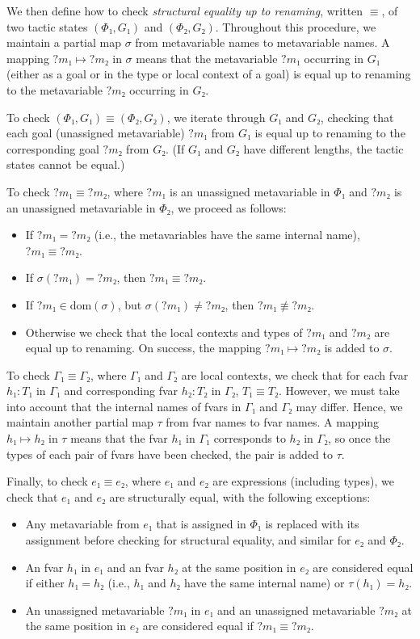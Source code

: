 \documentclass[sigplan,10pt,anonymous,review]{acmart}
\newcommand{\mvar}[1]{{?#1}}
\newcommand{\dom}{\ensuremath{\mathrm{dom}}}
\begin{document}
We then define how to check \emph{structural equality up to renaming}, written $≡$, of two tactic states $(Φ₁, G₁)$ and $(Φ₂, G₂)$.
Throughout this procedure, we maintain a partial map $σ$ from metavariable names to metavariable names.
A mapping $\mvar{m₁} ↦ \mvar{m₂}$ in $σ$ means that the metavariable $\mvar{m₁}$ occurring in $G₁$ (either as a goal or in the type or local context of a goal) is equal up to renaming to the metavariable $\mvar{m₂}$ occurring in $G₂$.

To check $(Φ₁, G₁) ≡ (Φ₂, G₂)$, we iterate through $G₁$ and $G₂$, checking that each goal (unassigned metavariable) $\mvar{m₁}$ from $G₁$ is equal up to renaming to the corresponding goal $\mvar{m₂}$ from $G₂$.
(If $G₁$ and $G₂$ have different lengths, the tactic states cannot be equal.)

To check $\mvar{m₁} ≡ \mvar{m₂}$, where $\mvar{m₁}$ is an unassigned metavariable in $Φ₁$ and $\mvar{m₂}$ is an unassigned metavariable in $Φ₂$, we proceed as follows:
\begin{itemize}
  \item If $\mvar{m₁} = \mvar{m₂}$ (i.e., the metavariables have the same internal name), $\mvar{m₁} ≡ \mvar{m₂}$.
  \item If $σ(\mvar{m₁}) = \mvar{m₂}$, then $\mvar{m₁} ≡ \mvar{m₂}$.
  \item If $\mvar{m₁} ∈ \dom(σ)$, but $σ(\mvar{m₁}) ≠ \mvar{m₂}$, then $\mvar{m₁} ≢ \mvar{m₂}$.
  \item Otherwise we check that the local contexts and types of $\mvar{m₁}$ and $\mvar{m₂}$ are equal up to renaming.
        On success, the mapping $\mvar{m₁} ↦ \mvar{m₂}$ is added to $σ$.
\end{itemize}

To check $Γ₁ ≡ Γ₂$, where $Γ₁$ and $Γ₂$ are local contexts, we check that for each fvar $h₁ : T₁$ in $Γ₁$ and corresponding fvar $h₂ : T₂$ in $Γ₂$, $T₁ ≡ T₂$.
However, we must take into account that the internal names of fvars in $Γ₁$ and $Γ₂$ may differ.
Hence, we maintain another partial map $τ$ from fvar names to fvar names.
A mapping $h₁ ↦ h₂$ in $τ$ means that the fvar $h₁$ in $Γ₁$ corresponds to $h₂$ in $Γ₂$, so once the types of each pair of fvars have been checked, the pair is added to $τ$.

Finally, to check $e₁ ≡ e₂$, where $e₁$ and $e₂$ are expressions (including types), we check that $e₁$ and $e₂$ are structurally equal, with the following exceptions:
\begin{itemize}
  \item Any metavariable from $e₁$ that is assigned in $Φ₁$ is replaced with its assignment before checking for structural equality, and similar for $e₂$ and $Φ₂$.
  \item An fvar $h₁$ in $e₁$ and an fvar $h₂$ at the same position in $e₂$ are considered equal if either $h₁ = h₂$ (i.e., $h₁$ and $h₂$ have the same internal name) or $τ(h₁) = h₂$.
  \item An unassigned metavariable $\mvar{m₁}$ in $e₁$ and an unassigned metavariable $\mvar{m₂}$ at the same position in $e₂$ are considered equal if $\mvar{m₁} ≡ \mvar{m₂}$.
\end{itemize}
\end{document}
